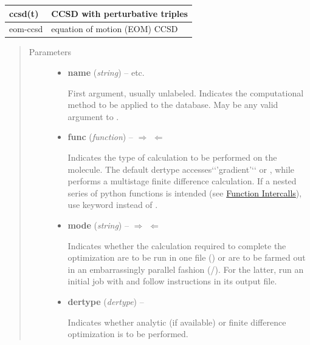 \documentclass[letterpaper,10pt,english]{sphinxmanual}
\begin{document}
\begin{fulllineitems}
\begin{tabulary}{\linewidth}{|L|L|}
ccsd(t)
 & 
CCSD with perturbative triples
\\\hline

eom-ccsd
 & 
equation of motion (EOM) CCSD
\\\hline
\end{tabulary}

\begin{quote}\begin{description}
\item[{Parameters}] \leavevmode\begin{itemize}
\item {} 
\textbf{name} (\emph{string}) -- 
 \textbar{}\textbar{}  \textbar{}\textbar{}  \textbar{}\textbar{} etc.

First argument, usually unlabeled. Indicates the computational method
to be applied to the database. May be any valid argument to
{\hyperref[index:driver.energy]{}}.


\item {} 
\textbf{func} (\emph{function}) -- 
$\Rightarrow$  $\Leftarrow$ \textbar{}\textbar{}  \textbar{}\textbar{} 

Indicates the type of calculation to be performed on the molecule.
The default dertype accesses{}`{}`'gradient'{}`{}` or , while
 performs a multistage finite difference calculation.
If a nested series of python functions is intended (see {\hyperref[index:function-intercalls]{Function Intercalls}}),
use keyword  instead of .


\item {} 
\textbf{mode} (\emph{string}) -- 
$\Rightarrow$  $\Leftarrow$ \textbar{}\textbar{}  \textbar{}\textbar{} 

Indicates whether the calculation required to complete the
optimization are to be run in one file () or are to be
farmed out in an embarrassingly parallel fashion
(/).  For the latter, run an initial job with
 and follow instructions in its output file.


\item {} 
\textbf{dertype} (\emph{dertype}) -- 
 \textbar{}\textbar{} 

Indicates whether analytic (if available) or finite difference
optimization is to be performed.



\end{itemize}
\end{description}
\end{quote}
\end{fulllineitems}
\end{document}
